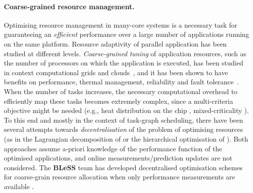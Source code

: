 \documentclass[a4paper,11pt]{article}
\newcommand{\project}[1]{\textbf{#1}\xspace}
\newcommand{\BLESS}{\project{BLeSS}}
\newcommand{\TheProject}{\BLESS}
\begin{document}
\paragraph{Coarse-grained resource management.}
Optimising resource management in many-core systems is a necessary task for guaranteeing an {\it efficient} performance over a large number of applications running on the same platform. Resource adaptivity of parallel application has been studied at different levels. 
\emph{Coarse-grained tuning} of application resources, such as the number of processors on which the application is executed, has been studied in context 
computational grids and clouds~\cite{gridSchedOverview,gridSelfAdaptive,DBLP:conf/pdp/AldinucciCDVKDLT08}, %
and it has been shown to have benefits on performance, thermal management, reliability and fault tolerance~\cite{gotzinger_role_2016,singh_survey_2017}. When the number of tasks increases, the necessary computational overhead to efficiently map these tasks becomes extremely complex, since a multi-criteria objective might be needed (e.g., heat distribution on the chip \cite{matsumoto_investigations_2010}, mixed-criticality \cite{saraswat_task_2009}). To this end and mostly in the context of task-graph scheduling, there have been several attempts towards \emph{decentralisation} of the problem of optimising resources (as in the Lagrangian decomposition of \cite{wildermann_multi-objective_2014} or the hierarchical optimisation of \cite{quan_hierarchical_2016}). Both approaches assume a-priori knowledge of the performance function of the optimised applications, and online measurements/prediction updates are not considered. The \TheProject{} team has developed decentralised optimisation schemes for coarse-grain resource allocation when only performance measurements are available \cite{chasparis_design_2016,MagECRTS,chasparis_reinforcement-learning-based_2015}.
\end{document}
